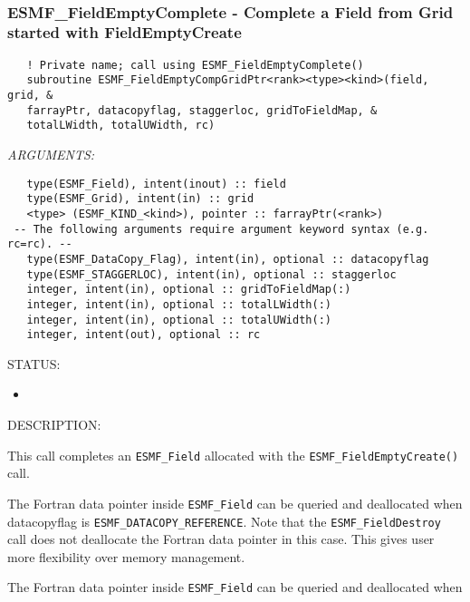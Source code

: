 \mbox{}\hrulefill\ 
 
\subsubsection [ESMF\_FieldEmptyComplete] {ESMF\_FieldEmptyComplete - Complete a Field from Grid started with FieldEmptyCreate }


   
\begin{verbatim}   ! Private name; call using ESMF_FieldEmptyComplete() 
   subroutine ESMF_FieldEmptyCompGridPtr<rank><type><kind>(field, grid, & 
   farrayPtr, datacopyflag, staggerloc, gridToFieldMap, & 
   totalLWidth, totalUWidth, rc) 
   \end{verbatim}{\em ARGUMENTS:}
\begin{verbatim}   type(ESMF_Field), intent(inout) :: field 
   type(ESMF_Grid), intent(in) :: grid 
   <type> (ESMF_KIND_<kind>), pointer :: farrayPtr(<rank>) 
 -- The following arguments require argument keyword syntax (e.g. rc=rc). --
   type(ESMF_DataCopy_Flag), intent(in), optional :: datacopyflag 
   type(ESMF_STAGGERLOC), intent(in), optional :: staggerloc 
   integer, intent(in), optional :: gridToFieldMap(:) 
   integer, intent(in), optional :: totalLWidth(:) 
   integer, intent(in), optional :: totalUWidth(:) 
   integer, intent(out), optional :: rc 
   \end{verbatim}
{\sf STATUS:}
   \begin{itemize} 
   \item{} 
   \end{itemize} 
   
{\sf DESCRIPTION:\\ }

 
   This call completes an {\tt ESMF\_Field} allocated with the 
   {\tt ESMF\_FieldEmptyCreate()} call. 
   
   \begin{sloppypar} 
   The Fortran data pointer inside {\tt ESMF\_Field} can be queried and deallocated when 
   datacopyflag is {\tt ESMF\_DATACOPY\_REFERENCE}. Note that the {\tt ESMF\_FieldDestroy} call does not deallocate 
   the Fortran data pointer in this case. This gives user more flexibility over memory management. 
   \end{sloppypar} 
   The Fortran data pointer inside {\tt ESMF\_Field} can be queried and deallocated when 
   
